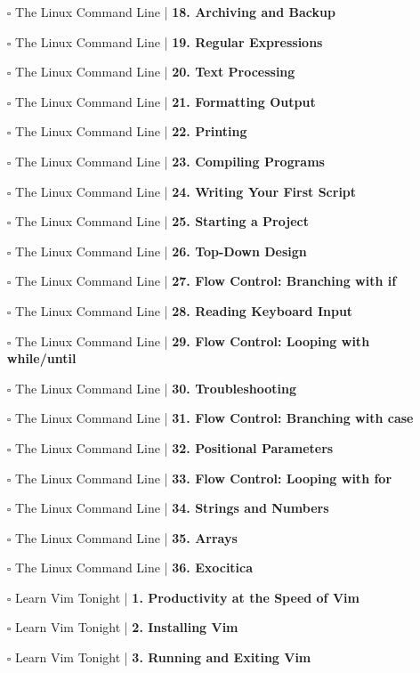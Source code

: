 \documentclass[a4, landscape, 12pt]{article}
\newcommand{\checkbox}{$\square$}%
\begin{document}
\begin{itemize}
{}
\item [\checkbox]  The Linux Command Line | \textbf{ 18. Archiving and Backup
}
\item [\checkbox]  The Linux Command Line | \textbf{ 19. Regular Expressions
}
\item [\checkbox]  The Linux Command Line | \textbf{ 20. Text Processing
}
\item [\checkbox]  The Linux Command Line | \textbf{ 21. Formatting Output
}
\item [\checkbox]  The Linux Command Line | \textbf{ 22. Printing
}
\item [\checkbox]  The Linux Command Line | \textbf{ 23. Compiling Programs
}
\item [\checkbox]  The Linux Command Line | \textbf{ 24. Writing Your First Script
}
\item [\checkbox]  The Linux Command Line | \textbf{ 25. Starting a Project
}
\item [\checkbox]  The Linux Command Line | \textbf{ 26. Top-Down Design
}
\item [\checkbox]  The Linux Command Line | \textbf{ 27. Flow Control: Branching with if
}
\item [\checkbox]  The Linux Command Line | \textbf{ 28. Reading Keyboard Input
}
\item [\checkbox]  The Linux Command Line | \textbf{ 29. Flow Control: Looping with while/until
}
\item [\checkbox]  The Linux Command Line | \textbf{ 30. Troubleshooting
}
\item [\checkbox]  The Linux Command Line | \textbf{ 31. Flow Control: Branching with case
}
\item [\checkbox]  The Linux Command Line | \textbf{ 32. Positional Parameters
}
\item [\checkbox]  The Linux Command Line | \textbf{ 33. Flow Control: Looping with for
}
\item [\checkbox]  The Linux Command Line | \textbf{ 34. Strings and Numbers
}
\item [\checkbox]  The Linux Command Line | \textbf{ 35. Arrays
}
\item [\checkbox]  The Linux Command Line | \textbf{ 36. Exocitica
}
\item [\checkbox]  Learn Vim Tonight | \textbf{ 1. Productivity at the Speed of Vim
}
\item [\checkbox]  Learn Vim Tonight | \textbf{ 2. Installing Vim
}
\item [\checkbox]  Learn Vim Tonight | \textbf{ 3. Running and Exiting Vim
}
\end{itemize}
\end{document}
